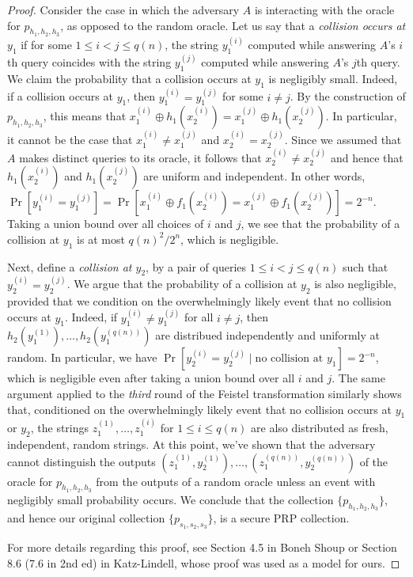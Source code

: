 \begin{proof}
Consider the case in which the adversary \(A\) is interacting with the
oracle for \(p_{h_1,h_2,h_3}\), as opposed to the random oracle. Let us
say that a \emph{collision occurs at \(y_1\)} if for some
\(1 \le i < j \le q(n)\), the string \(y_1^{(i)}\) computed while
answering \(A\)'s \(i\)th query coincides with the string \(y_1^{(j)}\)
computed while answering \(A\)'s \(j\)th query. We claim the probability
that a collision occurs at \(y_1\) is negligibly small. Indeed, if a
collision occurs at \(y_1\), then \(y_1^{(i)} = y_1^{(j)}\) for some
\(i \neq j\). By the construction of \(p_{h_1,h_2,h_3}\), this means
that
\(x_1^{(i)} \oplus h_1(x_2^{(i)}) = x_1^{(j)} \oplus h_1(x_2^{(j)})\).
In particular, it cannot be the case that \(x_1^{(i)} \neq x_1^{(j)}\)
and \(x_2^{(i)} = x_2^{(j)}\). Since we assumed that \(A\) makes
distinct queries to its oracle, it follows that
\(x_2^{(i)} \neq x_2^{(j)}\) and hence that \(h_1(x_2^{(i)})\) and
\(h_1(x_2^{(j)})\) are uniform and independent. In other words,
\(\Pr[y_1^{(i)} = y_1^{(j)}] = \Pr[x_1^{(i)} \oplus f_1(x_2^{(i)}) = x_1^{(j)} \oplus f_1(x_2^{(j)})] = 2^{-n}\).
Taking a union bound over all choices of \(i\) and \(j\), we see that
the probability of a collision at \(y_1\) is at most \(q(n)^2/2^n\),
which is negligible.

Next, define a \emph{collision at \(y_2\)}, by a pair of queries
\(1 \le i < j \le q(n)\) such that \(y_2^{(i)} = y_2^{(j)}\). We argue
that the probability of a collision at \(y_2\) is also negligible,
provided that we condition on the overwhelmingly likely event that no
collision occurs at \(y_1\). Indeed, if \(y_1^{(i)} \neq y_1^{(j)}\) for
all \(i \neq j\), then \(h_2(y_1^{(1)}), \ldots, h_2(y_1^{(q(n))})\) are
distribued independently and uniformly at random. In particular, we have
\(\Pr[y_2^{(i)} = y_2^{(j)} \mid \text{no collision at }y_1] = 2^{-n}\),
which is negligible even after taking a union bound over all \(i\) and
\(j\). The same argument applied to the \emph{third} round of the
Feistel transformation similarly shows that, conditioned on the
overwhelmingly likely event that no collision occurs at \(y_1\) or
\(y_2\), the strings \(z_1^{(1)}, \ldots, z_1^{(i)}\) for
\(1 \le i \le q(n)\) are also distributed as fresh, independent, random
strings. At this point, we've shown that the adversary cannot
distinguish the outputs
\((z_1^{(1)}, y_2^{(1)}), \ldots, (z_1^{(q(n))}, y_2^{(q(n))})\) of the
oracle for \(p_{h_1,h_2,h_3}\) from the outputs of a random oracle
unless an event with negligibly small probability occurs. We conclude
that the collection \(\{p_{h_1,h_2,h_3}\}\), and hence our original
collection \(\{p_{s_1,s_2,s_3}\}\), is a secure PRP collection.

For more details regarding this proof, see Section 4.5 in Boneh Shoup or
Section 8.6 (7.6 in 2nd ed) in Katz-Lindell, whose proof was used as a
model for ours.

\end{proof}

